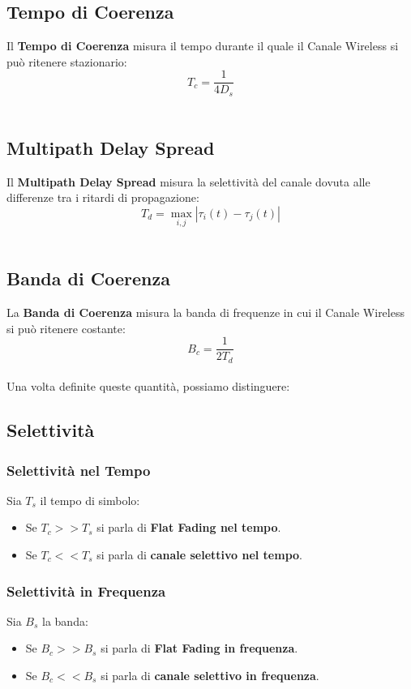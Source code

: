 \subsection{Tempo di Coerenza}
Il \textbf{Tempo di Coerenza} misura il tempo durante il quale il Canale Wireless si può ritenere stazionario:
\begin{equation*}
    T_c = \frac{1}{4D_s}
\end{equation*}
\\

\subsection{Multipath Delay Spread}
Il \textbf{Multipath Delay Spread} misura la selettività del canale dovuta alle differenze tra i ritardi di propagazione:
\begin{equation*}
    T_d = \max_{i,j} \left|\tau_i(t) - \tau_j(t) \right|
\end{equation*}
\\

\subsection{Banda di Coerenza}
La \textbf{Banda di Coerenza} misura la banda di frequenze in cui il Canale Wireless si può ritenere costante:
\begin{equation*}
    B_c = \frac{1}{2T_d}
\end{equation*}
\\

Una volta definite queste quantità, possiamo distinguere:
\subsection{Selettività}
\subsubsection{Selettività nel Tempo}
Sia $T_s$ il tempo di simbolo:
\begin{itemize}
    \item Se $T_c >> T_s$ si parla di \textbf{Flat Fading nel tempo}.
    \item Se $T_c << T_s$ si parla di \textbf{canale selettivo nel tempo}.
\end{itemize}

\subsubsection{Selettività in Frequenza}
Sia $B_s$ la banda:
\begin{itemize}
    \item Se $B_c >> B_s$ si parla di \textbf{Flat Fading in frequenza}.
    \item Se $B_c << B_s$ si parla di \textbf{canale selettivo in frequenza}.
\end{itemize}
 


